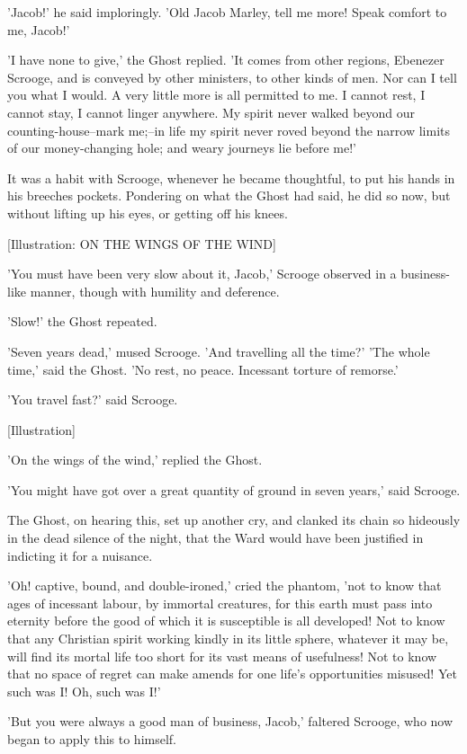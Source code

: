 'Jacob!' he said imploringly. 'Old Jacob Marley, tell me more! Speak
comfort to me, Jacob!'

'I have none to give,' the Ghost replied. 'It comes from other regions,
Ebenezer Scrooge, and is conveyed by other ministers, to other kinds of
men. Nor can I tell you what I would. A very little more is all
permitted to me. I cannot rest, I cannot stay, I cannot linger anywhere.
My spirit never walked beyond our counting-house--mark me;--in life my
spirit never roved beyond the narrow limits of our money-changing hole;
and weary journeys lie before me!'

It was a habit with Scrooge, whenever he became thoughtful, to put his
hands in his breeches pockets. Pondering on what the Ghost had said, he
did so now, but without lifting up his eyes, or getting off his knees.

[Illustration: ON THE WINGS OF THE WIND]

'You must have been very slow about it, Jacob,' Scrooge observed in a
business-like manner, though with humility and deference.

'Slow!' the Ghost repeated.

'Seven years dead,' mused Scrooge. 'And travelling all the time?'
'The whole time,' said the Ghost. 'No rest, no peace. Incessant torture
of remorse.'

'You travel fast?' said Scrooge.

[Illustration]

'On the wings of the wind,' replied the Ghost.

'You might have got over a great quantity of ground in seven years,'
said Scrooge.

The Ghost, on hearing this, set up another cry, and clanked its chain so
hideously in the dead silence of the night, that the Ward would have
been justified in indicting it for a nuisance.

'Oh! captive, bound, and double-ironed,' cried the phantom, 'not to know
that ages of incessant labour, by immortal creatures, for this earth
must pass into eternity before the good of which it is susceptible is
all developed! Not to know that any Christian spirit working kindly in
its little sphere, whatever it may be, will find its mortal life too
short for its vast means of usefulness! Not to know that no space of
regret can make amends for one life's opportunities misused! Yet such
was I! Oh, such was I!'

'But you were always a good man of business, Jacob,' faltered Scrooge,
who now began to apply this to himself.

